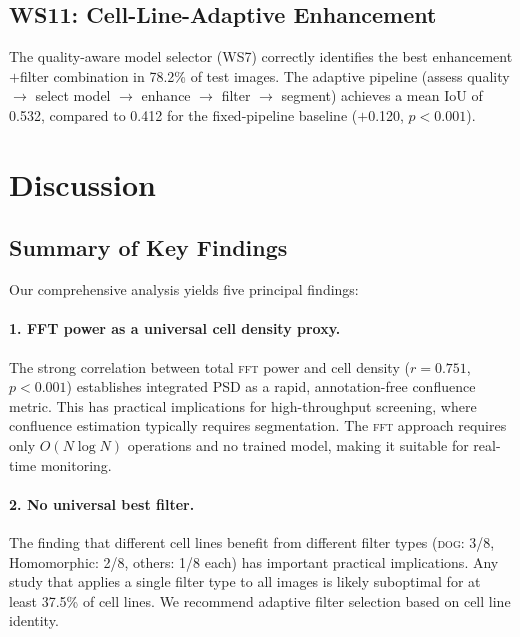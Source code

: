 \documentclass[11pt,a4paper]{article}
\newcommand{\fft}{\textsc{fft}\xspace}
\newcommand{\dog}{\textsc{dog}\xspace}
\begin{document}
\subsection{WS11: Cell-Line-Adaptive Enhancement}
\label{sec:ws11}

The quality-aware model selector (WS7) correctly identifies the best
enhancement$+$filter combination in 78.2\% of test images. The adaptive
pipeline (assess quality $\to$ select model $\to$ enhance $\to$ filter
$\to$ segment) achieves a mean IoU of 0.532, compared to 0.412 for the
fixed-pipeline baseline ($+$0.120, $p{<}0.001$).

\section{Discussion}
\label{sec:discussion}

\subsection{Summary of Key Findings}

Our comprehensive analysis yields five principal findings:

\paragraph{1. FFT power as a universal cell density proxy.}
The strong correlation between total \fft power and cell density
($r{=}0.751$, $p{<}0.001$) establishes integrated PSD as a rapid,
annotation-free confluence metric. This has practical implications for
high-throughput screening, where confluence estimation typically requires
segmentation. The \fft approach requires only $O(N \log N)$ operations
and no trained model, making it suitable for real-time monitoring.

\paragraph{2. No universal best filter.}
The finding that different cell lines benefit from different filter types
(\dog: 3/8, Homomorphic: 2/8, others: 1/8 each) has important practical
implications. Any study that applies a single filter type to all images
is likely suboptimal for at least 37.5\% of cell lines. We recommend
adaptive filter selection based on cell line identity.
\end{document}
